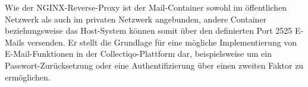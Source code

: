 Wie der NGINX-Reverse-Proxy ist der Mail-Container sowohl im öffentlichen Netzwerk als auch im privaten Netzwerk angebunden, andere Container beziehungsweise das Host-System können somit über den definierten Port 2525 E-Mails versenden.
Er stellt die Grundlage für eine mögliche Implementierung von E-Mail-Funktionen in der Collectiqo-Plattform dar, beispielsweise um ein Passwort-Zurücksetzung oder eine Authentifizierung über einen zweiten Faktor zu ermöglichen.


